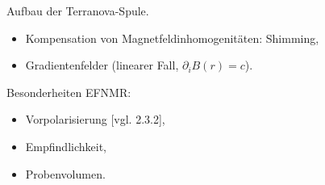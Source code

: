 \documentclass{subfiles}
\begin{document}
    \begin{Frage}
        Aufbau der Terranova-Spule.
        \begin{itemize}[label=$\to$]
            \item Kompensation von Magnetfeldinhomogenitäten: Shimming,
            \item Gradientenfelder (linearer Fall, $\partial_i B(r) = c$).
        \end{itemize}
    \end{Frage}
    \begin{Antwort}
        
    \end{Antwort}

    \begin{Frage}
        Besonderheiten EFNMR:
        \begin{itemize}[label=$\to$]
            \item Vorpolarisierung [vgl. 2.3.2],
            \item Empfindlichkeit,
            \item Probenvolumen.
        \end{itemize}
    \end{Frage}
    \begin{Antwort}
        
    \end{Antwort}
\end{document}
